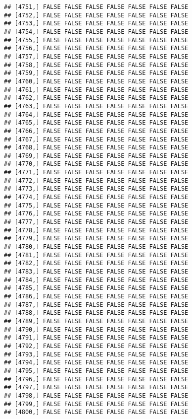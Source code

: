 \documentclass[
]{article}
\begin{document}
\begin{verbatim}
## [4751,] FALSE FALSE FALSE FALSE FALSE FALSE FALSE
## [4752,] FALSE FALSE FALSE FALSE FALSE FALSE FALSE
## [4753,] FALSE FALSE FALSE FALSE FALSE FALSE FALSE
## [4754,] FALSE FALSE FALSE FALSE FALSE FALSE FALSE
## [4755,] FALSE FALSE FALSE FALSE FALSE FALSE FALSE
## [4756,] FALSE FALSE FALSE FALSE FALSE FALSE FALSE
## [4757,] FALSE FALSE FALSE FALSE FALSE FALSE FALSE
## [4758,] FALSE FALSE FALSE FALSE FALSE FALSE FALSE
## [4759,] FALSE FALSE FALSE FALSE FALSE FALSE FALSE
## [4760,] FALSE FALSE FALSE FALSE FALSE FALSE FALSE
## [4761,] FALSE FALSE FALSE FALSE FALSE FALSE FALSE
## [4762,] FALSE FALSE FALSE FALSE FALSE FALSE FALSE
## [4763,] FALSE FALSE FALSE FALSE FALSE FALSE FALSE
## [4764,] FALSE FALSE FALSE FALSE FALSE FALSE FALSE
## [4765,] FALSE FALSE FALSE FALSE FALSE FALSE FALSE
## [4766,] FALSE FALSE FALSE FALSE FALSE FALSE FALSE
## [4767,] FALSE FALSE FALSE FALSE FALSE FALSE FALSE
## [4768,] FALSE FALSE FALSE FALSE FALSE FALSE FALSE
## [4769,] FALSE FALSE FALSE FALSE FALSE FALSE FALSE
## [4770,] FALSE FALSE FALSE FALSE FALSE FALSE FALSE
## [4771,] FALSE FALSE FALSE FALSE FALSE FALSE FALSE
## [4772,] FALSE FALSE FALSE FALSE FALSE FALSE FALSE
## [4773,] FALSE FALSE FALSE FALSE FALSE FALSE FALSE
## [4774,] FALSE FALSE FALSE FALSE FALSE FALSE FALSE
## [4775,] FALSE FALSE FALSE FALSE FALSE FALSE FALSE
## [4776,] FALSE FALSE FALSE FALSE FALSE FALSE FALSE
## [4777,] FALSE FALSE FALSE FALSE FALSE FALSE FALSE
## [4778,] FALSE FALSE FALSE FALSE FALSE FALSE FALSE
## [4779,] FALSE FALSE FALSE FALSE FALSE FALSE FALSE
## [4780,] FALSE FALSE FALSE FALSE FALSE FALSE FALSE
## [4781,] FALSE FALSE FALSE FALSE FALSE FALSE FALSE
## [4782,] FALSE FALSE FALSE FALSE FALSE FALSE FALSE
## [4783,] FALSE FALSE FALSE FALSE FALSE FALSE FALSE
## [4784,] FALSE FALSE FALSE FALSE FALSE FALSE FALSE
## [4785,] FALSE FALSE FALSE FALSE FALSE FALSE FALSE
## [4786,] FALSE FALSE FALSE FALSE FALSE FALSE FALSE
## [4787,] FALSE FALSE FALSE FALSE FALSE FALSE FALSE
## [4788,] FALSE FALSE FALSE FALSE FALSE FALSE FALSE
## [4789,] FALSE FALSE FALSE FALSE FALSE FALSE FALSE
## [4790,] FALSE FALSE FALSE FALSE FALSE FALSE FALSE
## [4791,] FALSE FALSE FALSE FALSE FALSE FALSE FALSE
## [4792,] FALSE FALSE FALSE FALSE FALSE FALSE FALSE
## [4793,] FALSE FALSE FALSE FALSE FALSE FALSE FALSE
## [4794,] FALSE FALSE FALSE FALSE FALSE FALSE FALSE
## [4795,] FALSE FALSE FALSE FALSE FALSE FALSE FALSE
## [4796,] FALSE FALSE FALSE FALSE FALSE FALSE FALSE
## [4797,] FALSE FALSE FALSE FALSE FALSE FALSE FALSE
## [4798,] FALSE FALSE FALSE FALSE FALSE FALSE FALSE
## [4799,] FALSE FALSE FALSE FALSE FALSE FALSE FALSE
## [4800,] FALSE FALSE FALSE FALSE FALSE FALSE FALSE

\end{verbatim}
\end{document}

